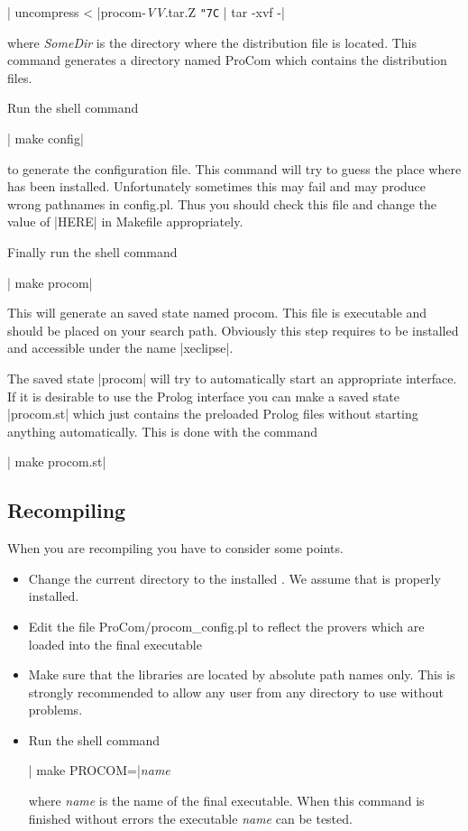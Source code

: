 |  uncompress < |{procom-{\em VV}.tar.Z} {\tt\char"7C} | tar -xvf -|

where {\em SomeDir}\/ is the directory where the distribution file is located.
This command generates a directory named {\sf ProCom} which contains the
distribution files.


Run the shell command 

|  make config|

to generate the configuration file. This command will try to guess the place
where \ProCom{} has been installed. Unfortunately sometimes this may fail and
may produce wrong pathnames in {\sf config.pl}. Thus you should check this file
and change the value of |HERE| in {\sf Makefile} appropriately.

Finally run the shell command

|  make procom|

This will generate an \eclipse{} saved state named {\sf procom}. This file is
executable and should be placed on your search path. Obviously this step
requires \eclipse{} to be installed and accessible under the name |xeclipse|.

The saved state |procom| will try to automatically start an appropriate
interface. If it is desirable to use the Prolog interface you can make a saved
state |procom.st| which just contains the preloaded Prolog files without
starting anything automatically. This is done with the command

|  make procom.st|



\subsection{Recompiling \ProCom}\label{sec:recompile}

When you are recompiling \ProCom{} you have to consider some points.

\begin{itemize}
  \item Change the current directory to the installed \ProCom.
	We assume that \ProCom{} is properly installed.
  \item Edit the file {\sf ProCom/procom\_config.pl}\/ to reflect the provers
	which are loaded into the final executable
  \item Make sure that the libraries are located by absolute path names only.
	This is strongly recommended to allow any user from any directory to
	use \ProCom{} without problems.
  \item Run the shell command

	|  make PROCOM=|{\em name}

	where {\em name}\/ is the name of the final executable. When this
	command is finished without errors the executable {\em name}\/ can be
	tested.
\end{itemize}





